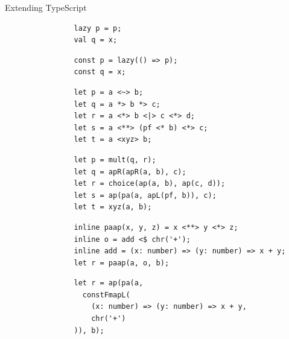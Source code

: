 \documentclass[aspectratio=169]{beamer}
\begin{document}
\begin{frame}[fragile]{Extending TypeScript}
        \begin{overprint}
            \begin{verbatim}
                lazy p = p;
                val q = x;
            \end{verbatim}
            \begin{verbatim}
                const p = lazy(() => p);
                const q = x;
            \end{verbatim}
            \begin{verbatim}
                let p = a <~> b;
                let q = a *> b *> c;
                let r = a <*> b <|> c <*> d;
                let s = a <**> (pf <* b) <*> c;
                let t = a <xyz> b;
            \end{verbatim}
            \begin{verbatim}
                let p = mult(q, r);
                let q = apR(apR(a, b), c);
                let r = choice(ap(a, b), ap(c, d));
                let s = ap(pa(a, apL(pf, b)), c);
                let t = xyz(a, b);
            \end{verbatim}
            \begin{verbatim}
                inline paap(x, y, z) = x <**> y <*> z;
                inline o = add <$ chr('+');
                inline add = (x: number) => (y: number) => x + y;
                let r = paap(a, o, b);
            \end{verbatim}
            \begin{verbatim}
                let r = ap(pa(a,
                  constFmapL(
                    (x: number) => (y: number) => x + y,
                    chr('+')
                )), b);
            \end{verbatim}
        \end{overprint}
    \end{frame}
\end{document}
